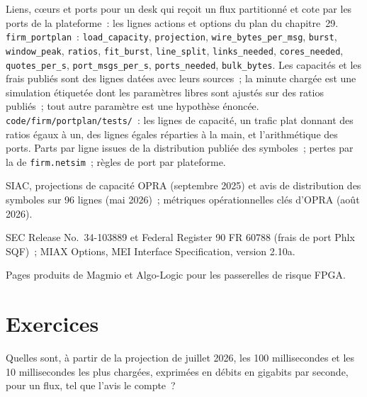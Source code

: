 \begin{build}
 Liens, cœurs et ports pour un desk qui reçoit un flux partitionné et cote par les ports de la plateforme~: les
  lignes actions et options du plan du chapitre~29.
 \texttt{firm\_portplan}~: \texttt{load\_capacity}, \texttt{projection}, \texttt{wire\_bytes\_per\_msg},
\texttt{burst}, \texttt{window\_peak}, \texttt{ratios}, \texttt{fit\_burst}, \texttt{line\_split}, \texttt{links\_needed},
\texttt{cores\_needed}, \texttt{quotes\_per\_s}, \texttt{port\_msgs\_per\_s}, \texttt{ports\_needed}, \texttt{bulk\_bytes}.
 Les capacités et les frais publiés sont des lignes datées avec leurs sources~; la minute chargée est une simulation étiquetée dont les
  paramètres libres sont ajustés sur des ratios publiés~; tout autre paramètre est une hypothèse énoncée.
 \texttt{code/firm/portplan/tests/}~: les lignes de capacité, un trafic plat donnant des ratios égaux à un, des lignes égales
  réparties à la main, et l'arithmétique des ports.
 Parts par ligne issues de la distribution publiée des symboles~; pertes par la  de \texttt{firm.netsim}~; règles de
  port par plateforme.
\end{build}

\begin{omsources}
\item SIAC, projections de capacité OPRA (septembre 2025) et avis de distribution des symboles sur 96 lignes (mai 2026)~; métriques opérationnelles
  clés d'OPRA (août 2026).
\item SEC Release No.~34-103889 et Federal Register 90 FR 60788 (frais de port Phlx SQF)~; MIAX Options, MEI Interface
  Specification, version 2.10a.
\item Pages produits de Magmio et Algo-Logic pour les passerelles de risque FPGA.
\end{omsources}

\section{Exercices}

\begin{exercise}[$\star$]\label{exo:nw:equities-and-options-connectivity:1}
Quelles sont, à partir de la projection de juillet 2026, les 100 millisecondes et les 10 millisecondes les plus chargées, exprimées en débits en gigabits par seconde,
pour un flux, tel que l'avis le compte~?
\end{exercise}

